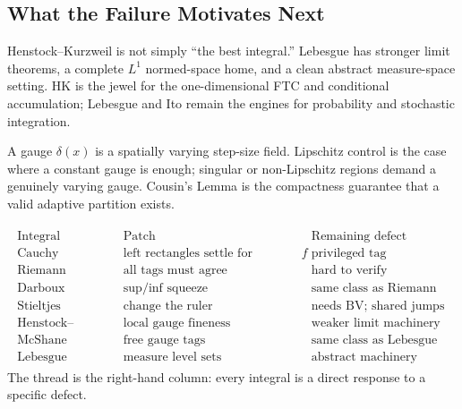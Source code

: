 \subsection*{What the Failure Motivates Next}

\begin{remark*}[Interpretation]
Henstock--Kurzweil is not simply ``the best integral.'' Lebesgue has stronger
limit theorems, a complete \(L^1\) normed-space home, and a clean abstract
measure-space setting. HK is the jewel for the one-dimensional FTC and
conditional accumulation; Lebesgue and Ito remain the engines for probability
and stochastic integration.
\end{remark*}

\begin{remark*}[Interpretation]
A gauge \(\delta(x)\) is a spatially varying step-size field. Lipschitz
control is the case where a constant gauge is enough; singular or non-Lipschitz
regions demand a genuinely varying gauge. Cousin's Lemma is the compactness
guarantee that a valid adaptive partition exists.
\end{remark*}

\begin{remark*}[Interpretation]
\[
\begin{aligned}
\begin{array}{c|c|c}
\text{Integral} & \text{Patch} & \text{Remaining defect}\\
\hline
\text{Cauchy} & \text{left rectangles settle for continuous } f &
\text{privileged tag}\\
\text{Riemann} & \text{all tags must agree} &
\text{hard to verify}\\
\text{Darboux} & \text{sup/inf squeeze} &
\text{same class as Riemann}\\
\text{Stieltjes} & \text{change the ruler} &
\text{needs BV; shared jumps}\\
\text{Henstock--Kurzweil} & \text{local gauge fineness} &
\text{weaker limit machinery}\\
\text{McShane} & \text{free gauge tags} &
\text{same class as Lebesgue}\\
\text{Lebesgue} & \text{measure level sets} &
\text{abstract machinery required}
\end{array}
\end{aligned}
\]
The thread is the right-hand column: every integral is a direct response to a
specific defect.
\end{remark*}
